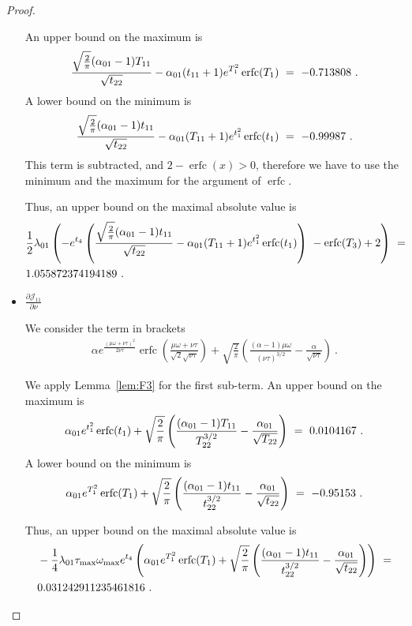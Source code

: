 \documentclass{article}
\DeclareMathOperator{\erfc}{erfc}
\begin{document}
\begin{proof}
\begin{itemize}
An upper bound on the maximum is
\begin{align}
\frac{\sqrt{\frac{2}{\pi }} (\alpha_{\rm 01}-1)
  T_{11}}{\sqrt{t_{22}}}-\alpha_{\rm 01}
  (t_{11}+1) e^{T_1^2} \erfc (T_1) \ = \ 
-0.713808\ .
\end{align}
A lower bound on the minimum is
\begin{align}
\frac{\sqrt{\frac{2}{\pi }} (\alpha_{\rm 01}-1)
  t_{11}}{\sqrt{t_{22}}}-\alpha_{\rm 01}
  (T_{11}+1) e^{t_1^2} \erfc (t_1) 
\ = \ 
-0.99987\ .
\end{align}
This term is subtracted, and $2-\erfc (x)>0$, therefore we have
to use the minimum and the maximum for the argument of $\erfc $.

Thus, an upper bound on the maximal absolute value is 
\begin{align}
&\frac{1}{2} \lambda_{\rm 01} \left(-e^{t_4}
  \left(\frac{\sqrt{\frac{2}{\pi }} (\alpha_{\rm 01}-1)
  t_{11}}{\sqrt{t_{22}}}-\alpha_{\rm 01}
  (T_{11}+1) e^{t_1^2}
  \erfc (t_1)\right)\ -  \erfc (T_3)+2\right)
  \ = \ \\ \nonumber
&1.055872374194189\ .
\end{align}

\item $\frac{\partial {\mathcal J}_{11}}{\partial \nu}$

We consider the term in brackets
\begin{align}
\alpha  e^{\frac{(\mu \omega+\nu \tau)^2}{2 \nu
  \tau}} \erfc \left(\frac{\mu \omega+\nu
  \tau}{\sqrt{2} \sqrt{\nu
  \tau}}\right)+\sqrt{\frac{2}{\pi }} \left(\frac{(\alpha -1)
  \mu \omega}{(\nu \tau)^{3/2}}-\frac{\alpha
  }{\sqrt{\nu \tau}}\right) \ .
\end{align}

We apply Lemma~\ref{lem:F3} for the first sub-term.
An upper bound on the maximum is
\begin{align}
\alpha_{\rm 01} e^{t_1^2}
  \erfc (t_1)+\sqrt{\frac{2}{\pi }}
  \left(\frac{(\alpha_{\rm 01}-1)
  T_{11} }{T_{22}^{3/2}}-\frac{\alpha_{\rm 01} }{\sqrt{T_{22}}}\right) \ = \ 
0.0104167\ .
\end{align}
A lower bound on the minimum is
\begin{align}
  \alpha_{\rm 01} e^{T_1^2}
  \erfc (T_1)+\sqrt{\frac{2}{\pi }}
  \left(\frac{(\alpha_{\rm 01}-1)
  t_{11}}{t_{22}^{3/2}}-\frac{\alpha_{\rm 01}}{\sqrt{t_{22}}}\right) \ = \
-0.95153\ .
\end{align}

Thus, an upper bound on the maximal absolute value is 
\begin{align}
&-\frac{1}{4} \lambda_{\rm 01} \tau_{\rm max} \omega_{\rm max}
  e^{t_4} \left(\alpha_{\rm 01} e^{T_1^2}
  \erfc (T_1)+\sqrt{\frac{2}{\pi }}
  \left(\frac{(\alpha_{\rm 01}-1)
  t_{11}}{t_{22}^{3/2}}-\frac{\alpha_{\rm 01}}{\sqrt{t_{22}}}\right)\right) \ = \\ \nonumber
&0.031242911235461816\ .
\end{align}


\end{itemize}
\end{proof}
\end{document}
